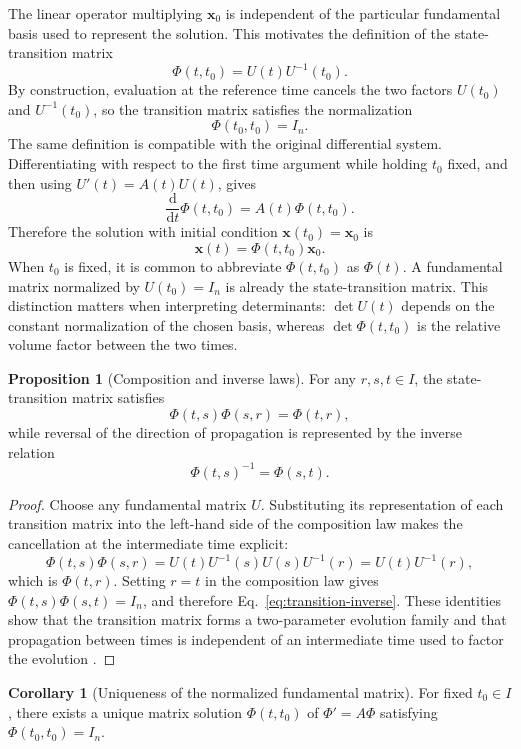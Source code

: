 \documentclass[11pt,a4paper]{article}
\newcommand{\be}{\begin{equation}}
\newcommand{\ee}{\end{equation}}
\newcommand{\lb}[1]{\label{#1}}
\newcommand{\dd}{\mathrm{d}}
\theoremstyle{definition}
\newtheorem{proposition}{Proposition}[section]
\newtheorem{corollary}{Corollary}[section]
\numberwithin{equation}{section}
\begin{document}
The linear operator multiplying $\mathbf{x}_0$ is independent of the particular fundamental basis used to represent the solution. This motivates the definition of the state-transition matrix
\be
\Phi(t,t_0)=U(t)U^{-1}(t_0).
\lb{eq:transition-definition}
\ee
By construction, evaluation at the reference time cancels the two factors $U(t_0)$ and $U^{-1}(t_0)$, so the transition matrix satisfies the normalization
\be
\Phi(t_0,t_0)=I_n.
\lb{eq:transition-initial}
\ee
The same definition is compatible with the original differential system. Differentiating with respect to the first time argument while holding $t_0$ fixed, and then using $U'(t)=A(t)U(t)$, gives
\be
\frac{\dd}{\dd t}\Phi(t,t_0)=A(t)\Phi(t,t_0).
\lb{eq:transition-ode}
\ee
Therefore the solution with initial condition $\mathbf{x}(t_0)=\mathbf{x}_0$ is
\be
\mathbf{x}(t)=\Phi(t,t_0)\mathbf{x}_0.
\lb{eq:flow}
\ee
When $t_0$ is fixed, it is common to abbreviate $\Phi(t,t_0)$ as $\Phi(t)$. A fundamental matrix normalized by $U(t_0)=I_n$ is already the state-transition matrix. This distinction matters when interpreting determinants: $\det U(t)$ depends on the constant normalization of the chosen basis, whereas $\det\Phi(t,t_0)$ is the relative volume factor between the two times.

\begin{proposition}[Composition and inverse laws]
For any $r,s,t\in I$, the state-transition matrix satisfies
\be
\Phi(t,s)\Phi(s,r)=\Phi(t,r),
\lb{eq:transition-composition}
\ee
while reversal of the direction of propagation is represented by the inverse relation
\be
\Phi(t,s)^{-1}=\Phi(s,t).
\lb{eq:transition-inverse}
\ee
\end{proposition}

\begin{proof}
Choose any fundamental matrix $U$. Substituting its representation of each transition matrix into the left-hand side of the composition law makes the cancellation at the intermediate time explicit:
\be
\Phi(t,s)\Phi(s,r)
=
U(t)U^{-1}(s)U(s)U^{-1}(r)
=
U(t)U^{-1}(r),
\ee
which is $\Phi(t,r)$. Setting $r=t$ in the composition law gives $\Phi(t,s)\Phi(s,t)=I_n$, and therefore Eq.~\eqref{eq:transition-inverse}. These identities show that the transition matrix forms a two-parameter evolution family and that propagation between times is independent of an intermediate time used to factor the evolution \cite{coddington1955,teschl2012}.
\end{proof}

\begin{corollary}[Uniqueness of the normalized fundamental matrix]
For fixed $t_0\in I$, there exists a unique matrix solution $\Phi(t,t_0)$ of $\Phi'=A\Phi$ satisfying $\Phi(t_0,t_0)=I_n$.
\end{corollary}
\end{document}
